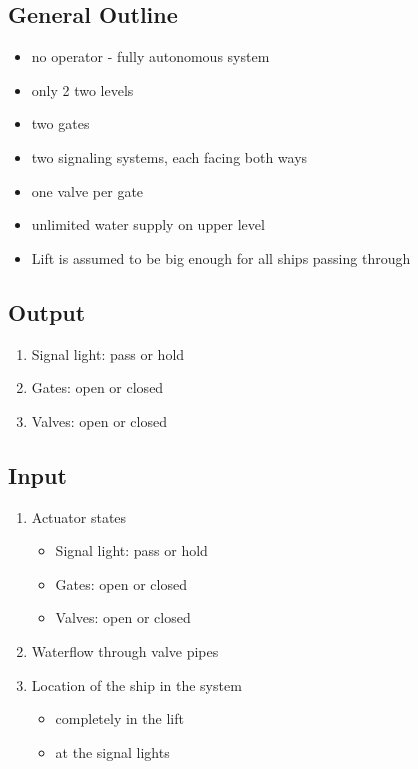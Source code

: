 \subsection{General Outline}
\begin{itemize}
	\item no operator - fully autonomous system
	\item only 2 two levels
	\item two gates
	\item two signaling systems, each facing both ways
	\item one valve per gate
	\item unlimited water supply on upper level
	\item Lift is assumed to be big enough for all ships passing through
\end{itemize}
\pagebreak

\subsection{Output}
\begin{enumerate}
	\item Signal light: pass or hold
	\item Gates: open or closed
	\item Valves: open or closed
\end{enumerate}

\subsection{Input}
\begin{enumerate}
	\item Actuator states
	\begin{itemize}
		\item Signal light: pass or hold
		\item Gates: open or closed
		\item Valves: open or closed
	\end{itemize}
	\item Waterflow through valve pipes
	\item Location of the ship in the system
	\begin{itemize}
		\item completely in the lift
		\item at the signal lights
	\end{itemize}
\end{enumerate}